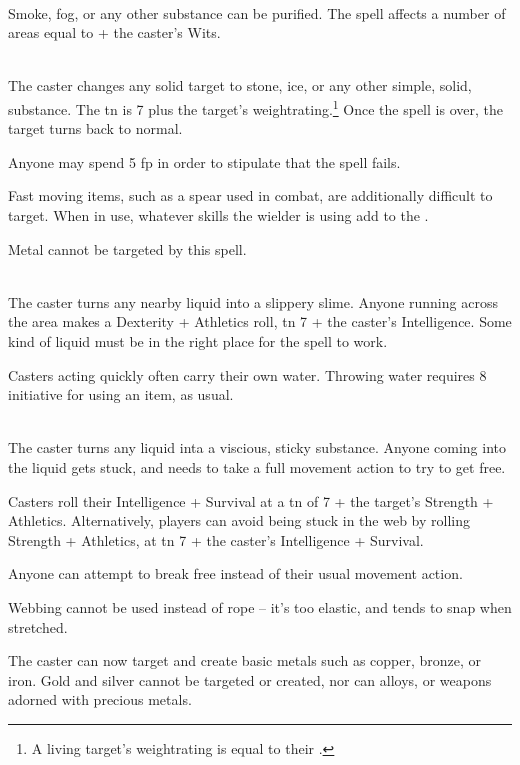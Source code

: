 \begin{multicols}{2}
\\
Smoke, fog, or any other substance can be purified.  The spell affects a number of areas equal to  + the caster's Wits.

\\
The caster changes any solid target to stone, ice, or any other simple, solid, substance.  The \gls{tn} is 7 plus the target's \gls{weightrating}.\footnote{A living target's \gls{weightrating} is equal to their .}
Once the spell is over, the target turns back to normal.

Anyone may spend 5 \gls{fp} in order to stipulate that the spell fails.

Fast moving items, such as a spear used in combat, are additionally difficult to target.  When in use, whatever skills the wielder is using add to the .

Metal cannot be targeted by this spell.

\\
The caster turns any nearby liquid into a slippery slime.  Anyone running across the area makes a Dexterity + Athletics roll, \gls{tn} 7 + the caster's Intelligence.  Some kind of liquid must be in the right place for the spell to work.

Casters acting quickly often carry their own water.  Throwing water requires 8 initiative for using an item, as usual.

\\
The caster turns any liquid inta a viscious, sticky substance.
Anyone coming into the liquid gets stuck, and needs to take a full movement action to try to get free.

Casters roll their Intelligence + Survival at a \gls{tn} of 7 + the target's Strength + Athletics. Alternatively, players can avoid being stuck in the web by rolling Strength + Athletics, at \gls{tn} 7 + the caster's Intelligence + Survival.

Anyone can attempt to break free instead of their usual movement action.

Webbing cannot be used instead of rope -- it's too elastic, and tends to snap when stretched.

The caster can now target and create basic metals such as copper, bronze, or iron.  Gold and silver cannot be targeted or created, nor can alloys, or weapons adorned with precious metals.


\end{multicols}

